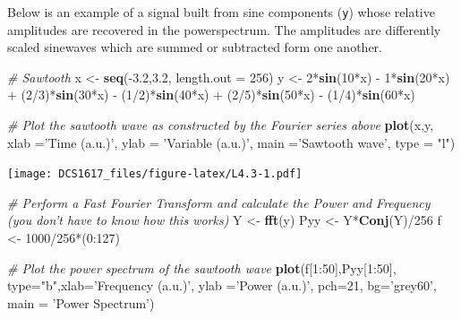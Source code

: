 \documentclass[]{book}
\newenvironment{Shaded}{\begin{snugshade}}{\end{snugshade}}
\newcommand{\KeywordTok}[1]{\textcolor[rgb]{0.13,0.29,0.53}{\textbf{{#1}}}}
\newcommand{\DataTypeTok}[1]{\textcolor[rgb]{0.13,0.29,0.53}{{#1}}}
\newcommand{\DecValTok}[1]{\textcolor[rgb]{0.00,0.00,0.81}{{#1}}}
\newcommand{\FloatTok}[1]{\textcolor[rgb]{0.00,0.00,0.81}{{#1}}}
\newcommand{\StringTok}[1]{\textcolor[rgb]{0.31,0.60,0.02}{{#1}}}
\newcommand{\CommentTok}[1]{\textcolor[rgb]{0.56,0.35,0.01}{\textit{{#1}}}}
\newcommand{\NormalTok}[1]{{#1}}
\begin{document}
Below is an example of a signal built from sine components (\texttt{y})
whose relative amplitudes are recovered in the powerspectrum. The
amplitudes are differently scaled sinewaves which are summed or
subtracted form one another.

\begin{Shaded}
\begin{Highlighting}[]
\CommentTok{# Sawtooth}
\NormalTok{x <-}\StringTok{ }\KeywordTok{seq}\NormalTok{(-}\FloatTok{3.2}\NormalTok{,}\FloatTok{3.2}\NormalTok{, }\DataTypeTok{length.out =} \DecValTok{256}\NormalTok{)}
\NormalTok{y <-}\StringTok{ }\DecValTok{2}\NormalTok{*}\KeywordTok{sin}\NormalTok{(}\DecValTok{10}\NormalTok{*x) -}\StringTok{ }\DecValTok{1}\NormalTok{*}\KeywordTok{sin}\NormalTok{(}\DecValTok{20}\NormalTok{*x) +}\StringTok{ }\NormalTok{(}\DecValTok{2}\NormalTok{/}\DecValTok{3}\NormalTok{)*}\KeywordTok{sin}\NormalTok{(}\DecValTok{30}\NormalTok{*x) -}\StringTok{ }\NormalTok{(}\DecValTok{1}\NormalTok{/}\DecValTok{2}\NormalTok{)*}\KeywordTok{sin}\NormalTok{(}\DecValTok{40}\NormalTok{*x) +}\StringTok{ }\NormalTok{(}\DecValTok{2}\NormalTok{/}\DecValTok{5}\NormalTok{)*}\KeywordTok{sin}\NormalTok{(}\DecValTok{50}\NormalTok{*x) -}\StringTok{ }\NormalTok{(}\DecValTok{1}\NormalTok{/}\DecValTok{4}\NormalTok{)*}\KeywordTok{sin}\NormalTok{(}\DecValTok{60}\NormalTok{*x)}

\CommentTok{# Plot the sawtooth wave as constructed by the Fourier series above}
\KeywordTok{plot}\NormalTok{(x,y, }\DataTypeTok{xlab =}\StringTok{'Time (a.u.)'}\NormalTok{, }\DataTypeTok{ylab =} \StringTok{'Variable (a.u.)'}\NormalTok{, }\DataTypeTok{main =}\StringTok{'Sawtooth wave'}\NormalTok{, }\DataTypeTok{type =} \StringTok{"l"}\NormalTok{)}
\end{Highlighting}
\end{Shaded}

\texttt{[image: DCS1617\_files/figure-latex/L4.3-1.pdf]}

\begin{Shaded}
\begin{Highlighting}[]
\CommentTok{# Perform a Fast Fourier Transform and calculate the Power and Frequency (you don't have to know how this works)}
\NormalTok{Y   <-}\StringTok{ }\KeywordTok{fft}\NormalTok{(y)}
\NormalTok{Pyy <-}\StringTok{ }\NormalTok{Y*}\KeywordTok{Conj}\NormalTok{(Y)/}\DecValTok{256}
\NormalTok{f <-}\StringTok{ }\DecValTok{1000}\NormalTok{/}\DecValTok{256}\NormalTok{*(}\DecValTok{0}\NormalTok{:}\DecValTok{127}\NormalTok{)}

\CommentTok{# Plot the power spectrum of the sawtooth wave}
\KeywordTok{plot}\NormalTok{(f[}\DecValTok{1}\NormalTok{:}\DecValTok{50}\NormalTok{],Pyy[}\DecValTok{1}\NormalTok{:}\DecValTok{50}\NormalTok{], }\DataTypeTok{type=}\StringTok{"b"}\NormalTok{,}\DataTypeTok{xlab=}\StringTok{'Frequency (a.u.)'}\NormalTok{, }\DataTypeTok{ylab =}\StringTok{'Power (a.u.)'}\NormalTok{, }\DataTypeTok{pch=}\DecValTok{21}\NormalTok{, }\DataTypeTok{bg=}\StringTok{'grey60'}\NormalTok{, }\DataTypeTok{main =} \StringTok{'Power Spectrum'}\NormalTok{)}
\end{Highlighting}
\end{Shaded}
\end{document}
